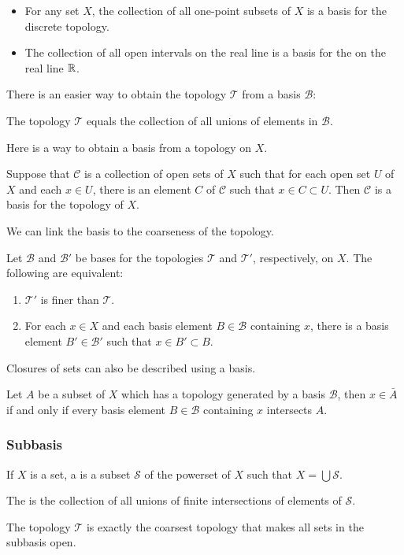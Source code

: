 \begin{example}
\begin{itemize}
\item For any set $X$, the collection of all one-point subsets of $X$ is a basis for the discrete topology.
\item The collection of all open intervals on the real line is a basis for the  on the real line $\mathbb{R}$.
\end{itemize}
\end{example}

There is an easier way to obtain the topology $\mathcal{T}$ from a basis $\mathcal{B}$:
\begin{lemma}
The topology $\mathcal{T}$ equals the collection of all unions of elements in $\mathcal{B}$.
\end{lemma}

Here is a way to obtain a basis from a topology on $X$.
\begin{lemma}
Suppose that $\mathcal{C}$ is a collection of open sets of $X$ such that for each open set $U$ of $X$ and each $x \in U$, there is an element $C$ of $\mathcal{C}$ such that $x\in C \subset U$. Then $\mathcal{C}$ is a basis for the topology of $X$.
\end{lemma}

We can link the basis to the coarseness of the topology.
\begin{lemma} \label{basisCoarseness}
Let $\mathcal{B}$ and $\mathcal{B}'$ be bases for the topologies $\mathcal{T}$ and $\mathcal{T}'$, respectively, on $X$. The following are equivalent:
\begin{enumerate}
\item $\mathcal{T}'$ is finer than $\mathcal{T}$.
\item For each $x\in X$ and each basis element $B\in\mathcal{B}$ containing $x$, there is a basis element $B'\in\mathcal{B'}$ such that $x\in B'\subset B$.
\end{enumerate}
\end{lemma}

Closures of sets can also be described using a basis.
\begin{lemma}
Let $A$ be a subset of $X$ which has a topology generated by a basis $\mathcal{B}$, then $x\in\bar{A}$ if and only if every basis element $B\in\mathcal{B}$ containing $x$ intersects $A$.
\end{lemma}

\subsubsection{Subbasis}
\begin{definition}
If $X$ is a set, a  is a subset $\mathcal{S}$ of the powerset of $X$ such that $X = \bigcup \mathcal{S}$.

The  is the collection of all unions of finite intersections of elements of $\mathcal{S}$. 
\end{definition}
The topology $\mathcal{T}$ is exactly the coarsest topology that makes all sets in the subbasis open.

